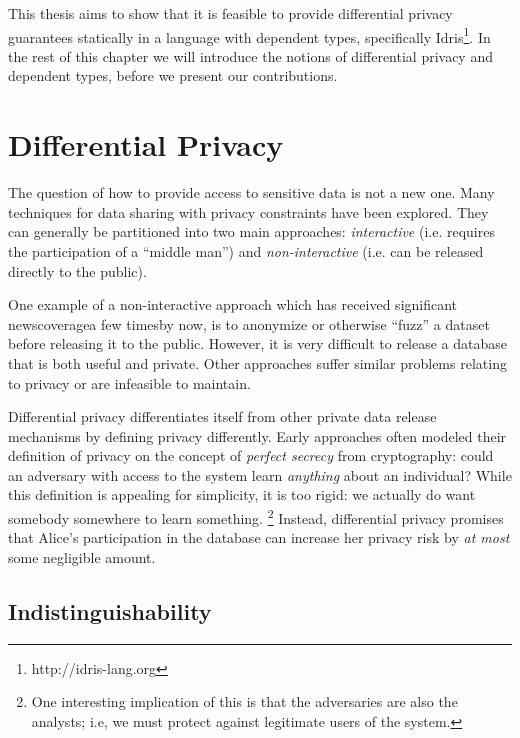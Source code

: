 \documentclass[12pt]{report}
\begin{document}
This thesis aims to show that it is feasible to provide differential privacy guarantees statically in a language with dependent types, specifically Idris\footnote{http://idris-lang.org}.
In the rest of this chapter we will introduce the notions of differential privacy and dependent types, before we present our contributions.

\section{Differential Privacy}\label{sec:intro-diffpriv}

The question of how to provide access to sensitive data is not a new one.
Many techniques for data sharing with privacy constraints have been explored.
They can generally be partitioned into two main approaches: \textit{interactive} (i.e. requires the participation of a ``middle man'') and \textit{non-interactive} (i.e. can be released directly to the public).

One example of a non-interactive approach which has received significant news\footnotemark[\ref{fn:aol}] coverage\footnotemark[\ref{fn:twitter}] a few times\footnotemark[\ref{fn:netflix}] by now\footnotemark[\ref{fn:gic}], is to anonymize or otherwise ``fuzz'' a dataset before releasing it to the public.
However, it is very difficult to release a database that is both useful and private.
Other approaches suffer similar problems relating to privacy or are infeasible to maintain\cite{journals/cacm/Dwork11}.

Differential privacy differentiates itself from other private data release mechanisms by defining privacy differently.
Early approaches often modeled their definition of privacy on the concept of \textit{perfect secrecy} from cryptography: could an adversary with access to the system learn \textit{anything} about an individual?
While this definition is appealing for simplicity, it is too rigid: we actually do want somebody somewhere to learn something.
\footnote{One interesting implication of this is that the adversaries are also the analysts; i.e, we must protect against legitimate users of the system.}
Instead, differential privacy promises that Alice's participation in the database can increase her privacy risk by \textit{at most} some negligible amount.

\subsection{Indistinguishability}\label{subsec:intro-indistinguishability}
\end{document}
